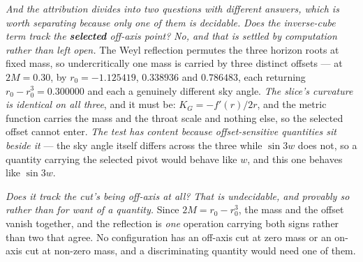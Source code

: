 \documentclass[11pt,a4paper]{article}
\theoremstyle{definition}
\begin{document}
\emph{And the attribution divides into two questions with different answers, which is worth separating because
only one of them is decidable.} \emph{Does the inverse-cube term track the \textbf{selected} off-axis point?}
\emph{No, and that is settled by computation rather than left open.} The Weyl reflection permutes the three
horizon roots at fixed mass, so undercritically one mass is carried by three distinct offsets --- at
$2M=0.30$, by $r_0=-1.125419$, $0.338936$ and $0.786483$, each returning $r_0-r_0^{3}=0.300000$ and each a
genuinely different sky angle. \emph{The slice's curvature is identical on all three}, and it must be:
$K_G=-f'(r)/2r$, and the metric function carries the mass and the throat scale and nothing else, so the
selected offset cannot enter. \emph{The test has content because offset-sensitive quantities sit beside it} ---
the sky angle itself differs across the three while $\sin 3w$ does not, so a quantity carrying the selected
pivot would behave like $w$, and this one behaves like $\sin 3w$.

\emph{Does it track the cut's being off-axis at all?} \emph{That is undecidable, and provably so rather than
for want of a quantity.} Since $2M=r_0-r_0^{3}$, the mass and the offset vanish together, and the reflection
is \emph{one} operation carrying both signs rather than two that agree. No configuration has an off-axis cut
at zero mass or an on-axis cut at non-zero mass, and a discriminating quantity would need one of them.
\end{document}

